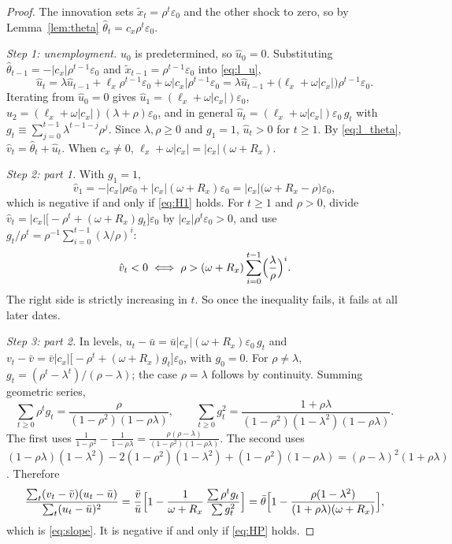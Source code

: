 \documentclass[authoryear, review, 12pt]{elsarticle}
\begin{document}
\begin{proof}
The innovation sets $\tilde x_t=\rho^t\varepsilon_0$ and the other shock to zero, so by
Lemma~\ref{lem:theta} $\hat\theta_t=c_x\rho^t\varepsilon_0$.

\emph{Step 1: unemployment.} $u_0$ is predetermined, so $\hat u_0=0$. Substituting
$\hat\theta_{t-1}=-\lvert c_x\rvert\rho^{t-1}\varepsilon_0$ and
$\tilde x_{t-1}=\rho^{t-1}\varepsilon_0$ into \eqref{eq:l_u},
\[
	\hat u_t=\lambda\hat u_{t-1}+\ell_x\rho^{t-1}\varepsilon_0
	+\omega\lvert c_x\rvert\rho^{t-1}\varepsilon_0
	=\lambda\hat u_{t-1}+\bigl(\ell_x+\omega\lvert c_x\rvert\bigr)\rho^{t-1}\varepsilon_0 .
\]
Iterating from $\hat u_0=0$ gives $\hat u_1=(\ell_x+\omega\lvert c_x\rvert)\varepsilon_0$,
$\hat u_2=(\ell_x+\omega\lvert c_x\rvert)(\lambda+\rho)\varepsilon_0$, and in general
$\hat u_t=(\ell_x+\omega\lvert c_x\rvert)\varepsilon_0\,g_t$ with
$g_t\equiv\sum_{j=0}^{t-1}\lambda^{t-1-j}\rho^j$. Since $\lambda,\rho\ge0$ and $g_1=1$,
$\hat u_t>0$ for $t\ge1$. By \eqref{eq:l_theta}, $\hat v_t=\hat\theta_t+\hat u_t$. When
$c_x\ne0$, $\ell_x+\omega\lvert c_x\rvert=\lvert c_x\rvert(\omega+R_x)$.

\emph{Step 2: part 1.} With $g_1=1$,
\[
	\hat v_1=-\lvert c_x\rvert\rho\varepsilon_0+\lvert c_x\rvert(\omega+R_x)\varepsilon_0
	=\lvert c_x\rvert\bigl(\omega+R_x-\rho\bigr)\varepsilon_0,
\]
which is negative if and only if \eqref{eq:H1} holds. For $t\ge1$ and $\rho>0$, divide
$\hat v_t=\lvert c_x\rvert\bigl[-\rho^t+(\omega+R_x)g_t\bigr]\varepsilon_0$ by
$\lvert c_x\rvert\rho^t\varepsilon_0>0$, and use $g_t/\rho^t=\rho^{-1}\sum_{i=0}^{t-1}(\lambda/\rho)^i$:
\begin{equation}\label{eq:vt_neg}
	\hat v_t<0
	\iff
	\rho>(\omega+R_x)\sum_{i=0}^{t-1}\Bigl(\frac{\lambda}{\rho}\Bigr)^i .
\end{equation}
The right side is strictly increasing in $t$. So once the inequality fails, it fails at all
later dates.

\emph{Step 3: part 2.} In levels,
$u_t-\bar u=\bar u\lvert c_x\rvert(\omega+R_x)\varepsilon_0\,g_t$ and
$v_t-\bar v=\bar v\lvert c_x\rvert\bigl[-\rho^t+(\omega+R_x)g_t\bigr]\varepsilon_0$, with
$g_0=0$. For $\rho\ne\lambda$, $g_t=(\rho^t-\lambda^t)/(\rho-\lambda)$; the case
$\rho=\lambda$ follows by continuity. Summing geometric series,
\[
	\sum_{t\ge0}\rho^tg_t=\frac{\rho}{(1-\rho^2)(1-\rho\lambda)},\qquad
	\sum_{t\ge0}g_t^2=\frac{1+\rho\lambda}{(1-\rho^2)(1-\lambda^2)(1-\rho\lambda)} .
\]
The first uses $\frac{1}{1-\rho^2}-\frac{1}{1-\rho\lambda}
=\frac{\rho(\rho-\lambda)}{(1-\rho^2)(1-\rho\lambda)}$. The second uses
$(1-\rho\lambda)(1-\lambda^2)-2(1-\rho^2)(1-\lambda^2)+(1-\rho^2)(1-\rho\lambda)
=(\rho-\lambda)^2(1+\rho\lambda)$. Therefore
\[
	\frac{\sum_t(v_t-\bar v)(u_t-\bar u)}{\sum_t(u_t-\bar u)^2}
	=\frac{\bar v}{\bar u}\Bigl[1-\frac{1}{\omega+R_x}\,\frac{\sum\rho^tg_t}{\sum g_t^2}\Bigr]
	=\bar\theta\Bigl[1-\frac{\rho(1-\lambda^2)}{(1+\rho\lambda)(\omega+R_x)}\Bigr],
\]
which is \eqref{eq:slope}. It is negative if and only if \eqref{eq:HP} holds.


\end{proof}
\end{document}
